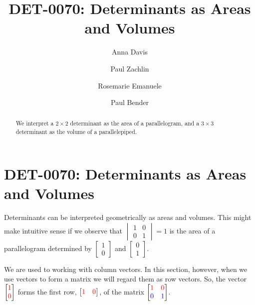 \documentclass{ximera}
\author{Anna Davis \and Paul Zachlin \and Rosemarie Emanuele \and Paul Bender} \title{DET-0070: Determinants as Areas and Volumes} \license{CC-BY 4.0}
\begin{document}
\begin{abstract}
 We interpret a $2\times 2$ determinant as the area of a parallelogram, and a $3\times 3$ determinant as the volume of a parallelepiped.
\end{abstract}
\maketitle

\section*{DET-0070: Determinants as Areas and Volumes}

Determinants can be interpreted geometrically as areas and volumes.  This might make intuitive sense if we observe that $\begin{vmatrix}1&0\\0&1\end{vmatrix}=1$ is the area of a parallelogram determined by $\begin{bmatrix}1\\0\end{bmatrix}$ and $\begin{bmatrix}0\\1\end{bmatrix}$.    

\begin{center}
\end{center}
We are used to working with column vectors.  In this section, however, when we use vectors to form a matrix we will regard them as row vectors.  So, the vector $\begin{bmatrix}{\color{red}1}\\{\color{red}0}\end{bmatrix}$ forms the first row, $\begin{bmatrix}{\color{red}1}&{\color{red}0}\end{bmatrix}$, of the matrix $\begin{bmatrix}{\color{red}1}&{\color{red}0}\\{\color{blue}0}&{\color{blue}1}\end{bmatrix}$.
\end{document}
